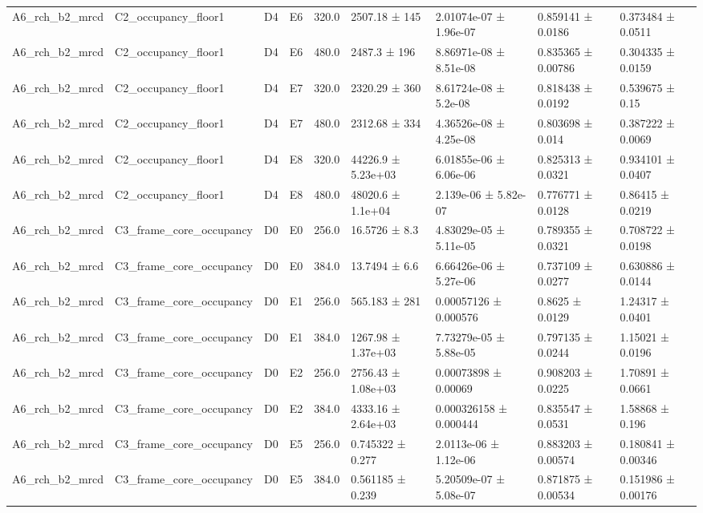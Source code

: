 \begin{table}
\begin{tabular}{lllllllll}
A6\_rch\_b2\_mrcd & C2\_occupancy\_floor1 & D4 & E6 & 320.0 & 2507.18 ± 145 & 2.01074e-07 ± 1.96e-07 & 0.859141 ± 0.0186 & 0.373484 ± 0.0511 \\
A6\_rch\_b2\_mrcd & C2\_occupancy\_floor1 & D4 & E6 & 480.0 & 2487.3 ± 196 & 8.86971e-08 ± 8.51e-08 & 0.835365 ± 0.00786 & 0.304335 ± 0.0159 \\
A6\_rch\_b2\_mrcd & C2\_occupancy\_floor1 & D4 & E7 & 320.0 & 2320.29 ± 360 & 8.61724e-08 ± 5.2e-08 & 0.818438 ± 0.0192 & 0.539675 ± 0.15 \\
A6\_rch\_b2\_mrcd & C2\_occupancy\_floor1 & D4 & E7 & 480.0 & 2312.68 ± 334 & 4.36526e-08 ± 4.25e-08 & 0.803698 ± 0.014 & 0.387222 ± 0.0069 \\
A6\_rch\_b2\_mrcd & C2\_occupancy\_floor1 & D4 & E8 & 320.0 & 44226.9 ± 5.23e+03 & 6.01855e-06 ± 6.06e-06 & 0.825313 ± 0.0321 & 0.934101 ± 0.0407 \\
A6\_rch\_b2\_mrcd & C2\_occupancy\_floor1 & D4 & E8 & 480.0 & 48020.6 ± 1.1e+04 & 2.139e-06 ± 5.82e-07 & 0.776771 ± 0.0128 & 0.86415 ± 0.0219 \\
A6\_rch\_b2\_mrcd & C3\_frame\_core\_occupancy & D0 & E0 & 256.0 & 16.5726 ± 8.3 & 4.83029e-05 ± 5.11e-05 & 0.789355 ± 0.0321 & 0.708722 ± 0.0198 \\
A6\_rch\_b2\_mrcd & C3\_frame\_core\_occupancy & D0 & E0 & 384.0 & 13.7494 ± 6.6 & 6.66426e-06 ± 5.27e-06 & 0.737109 ± 0.0277 & 0.630886 ± 0.0144 \\
A6\_rch\_b2\_mrcd & C3\_frame\_core\_occupancy & D0 & E1 & 256.0 & 565.183 ± 281 & 0.00057126 ± 0.000576 & 0.8625 ± 0.0129 & 1.24317 ± 0.0401 \\
A6\_rch\_b2\_mrcd & C3\_frame\_core\_occupancy & D0 & E1 & 384.0 & 1267.98 ± 1.37e+03 & 7.73279e-05 ± 5.88e-05 & 0.797135 ± 0.0244 & 1.15021 ± 0.0196 \\
A6\_rch\_b2\_mrcd & C3\_frame\_core\_occupancy & D0 & E2 & 256.0 & 2756.43 ± 1.08e+03 & 0.00073898 ± 0.00069 & 0.908203 ± 0.0225 & 1.70891 ± 0.0661 \\
A6\_rch\_b2\_mrcd & C3\_frame\_core\_occupancy & D0 & E2 & 384.0 & 4333.16 ± 2.64e+03 & 0.000326158 ± 0.000444 & 0.835547 ± 0.0531 & 1.58868 ± 0.196 \\
A6\_rch\_b2\_mrcd & C3\_frame\_core\_occupancy & D0 & E5 & 256.0 & 0.745322 ± 0.277 & 2.0113e-06 ± 1.12e-06 & 0.883203 ± 0.00574 & 0.180841 ± 0.00346 \\
A6\_rch\_b2\_mrcd & C3\_frame\_core\_occupancy & D0 & E5 & 384.0 & 0.561185 ± 0.239 & 5.20509e-07 ± 5.08e-07 & 0.871875 ± 0.00534 & 0.151986 ± 0.00176 \\

\end{tabular}
\end{table}
